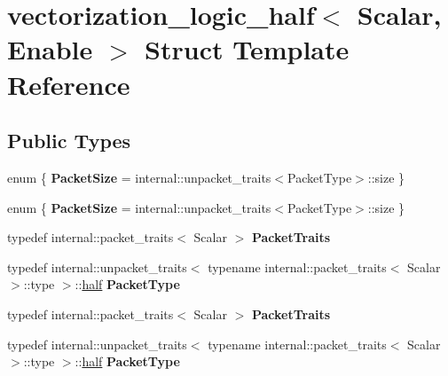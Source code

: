 \hypertarget{structvectorization__logic__half}{}\section{vectorization\+\_\+logic\+\_\+half$<$ Scalar, Enable $>$ Struct Template Reference}
\label{structvectorization__logic__half}
\subsection*{Public Types}
\begin{DoxyCompactItemize}
\item 
\mbox{\label{structvectorization__logic__half_ad7c65b9dfda253e6d9afd12262b195c2}} 
enum \{ {\bfseries Packet\+Size} = internal\+:\+:unpacket\+\_\+traits$<$Packet\+Type$>$\+:\+:size
 \}
\item 
\mbox{\label{structvectorization__logic__half_a2c191848a60e99c7ebf8f5803f2ee911}} 
enum \{ {\bfseries Packet\+Size} = internal\+:\+:unpacket\+\_\+traits$<$Packet\+Type$>$\+:\+:size
 \}
\item 
\mbox{\label{structvectorization__logic__half_abe70d70b8b8c02da43cf8fd212a3fb82}} 
typedef internal\+::packet\+\_\+traits$<$ Scalar $>$ {\bfseries Packet\+Traits}
\item 
\mbox{\label{structvectorization__logic__half_adb73d283509e7488c1e600d7ee2c59e4}} 
typedef internal\+::unpacket\+\_\+traits$<$ typename internal\+::packet\+\_\+traits$<$ Scalar $>$\+::type $>$\+::\hyperlink{struct_eigen_1_1half}{half} {\bfseries Packet\+Type}
\item 
\mbox{\label{structvectorization__logic__half_abe70d70b8b8c02da43cf8fd212a3fb82}} 
typedef internal\+::packet\+\_\+traits$<$ Scalar $>$ {\bfseries Packet\+Traits}
\item 
\mbox{\label{structvectorization__logic__half_adb73d283509e7488c1e600d7ee2c59e4}} 
typedef internal\+::unpacket\+\_\+traits$<$ typename internal\+::packet\+\_\+traits$<$ Scalar $>$\+::type $>$\+::\hyperlink{struct_eigen_1_1half}{half} {\bfseries Packet\+Type}
\end{DoxyCompactItemize}
